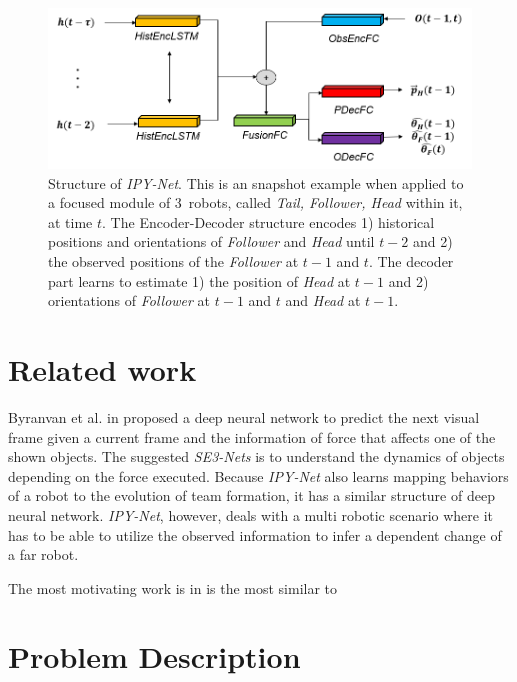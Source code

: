 \documentclass[letterpaper, 10 pt, conference]{ieeeconf}  %
\begin{document}
	\begin{figure}\centering
		\includegraphics[width=1.\columnwidth]{fig_DL_Pipeline}
		\caption{Structure of \emph{IPY-Net}. This is an snapshot example when applied to a focused module of
			$3$~robots, called \emph{Tail, Follower, Head} within it, at time $t$. 
			The Encoder-Decoder structure encodes
			1) historical positions and orientations of \emph{Follower} and \emph{Head} 
			until $t-2$ and 2) the observed positions of the \emph{Follower} at $t-1$ and $t$. 
			The decoder part learns to estimate 1) the position of \emph{Head} at $t-1$ and 
			2) orientations of \emph{Follower} at $t-1$ and $t$ and \emph{Head} at $t-1$.   
		}
		\label{fig:DL_Pipeline}
	\end{figure}
	
	
	\section{Related work}
	\label{sec:related_work}
	
	Byranvan et al. in \cite{Byravan17} proposed a deep neural network to predict the next visual 
	frame given a current frame and the information of force that affects one of the shown objects.
	The suggested \emph{SE3-Nets} is to understand the dynamics of 
	objects depending on the force executed. Because \emph{IPY-Net} also learns mapping 
	behaviors of a robot to the evolution of team formation, it has a similar structure of 
	deep neural network. \emph{IPY-Net}, however, deals with a multi robotic scenario where  
	it has to be able to utilize the observed information to infer a dependent change of 
	a far robot.  
	
	The most motivating work is in \cite{Choi17} is the most similar to 
	
	\section{Problem Description} 
	\label{sec:problem_description}
	
\end{document}
